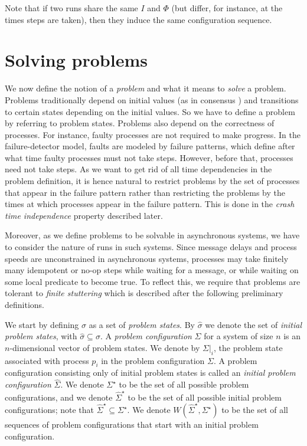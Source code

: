 \documentclass[11pt]{article}
\newcommand{\conf}{\Sigma}
\newcommand{\setConf}{\Sigma^\star}
\newcommand{\initConf}{\hat{\conf}}
\newcommand{\initSetConf}{\hat{\Sigma}^\star}
\newcommand{\seqprobconf}{W(\initSetConf,\setConf)}
\begin{document}
Note that if two runs share the same $I$ and $\Phi$ (but differ, for
     instance, at the times steps are taken), then they induce the
     same configuration sequence.



\section{Solving problems}\label{sec:problemDefinition}

We now define the notion of a \emph{problem} and what it means to
     \emph{solve} a problem.
Problems traditionally depend on initial values (as in consensus
     \cite{FLP}) and transitions to certain states depending on the
     initial values.
So we have to define a problem by referring to problem states.
Problems also depend on the correctness of processes.
For instance, faulty processes are not required to make progress.
In the failure-detector model, faults are modeled by failure patterns,
     which define after what time faulty processes must not take
     steps.
However, before that, processes need not take steps.
As we want to get rid of all time dependencies in the problem
     definition, it is hence natural to restrict problems by the set
     of processes that appear in the failure pattern rather than
     restricting the problems by the times at which  processes appear
     in the failure pattern.
This is done in the \emph{crash time independence} property described
     later.

Moreover, as we define problems to be solvable in asynchronous
     systems, we have to consider the nature of runs in such systems.
Since message delays and process speeds are unconstrained in
     asynchronous systems, processes may take finitely many idempotent
     or no-op steps while waiting for a message, or while waiting on
     some local predicate to become true.
To reflect this, we require that problems are tolerant to \emph{finite
     stuttering} which is described after the following preliminary
     definitions.

We start by defining $\sigma$ as a set of \emph{problem states}.
By $\hat{\sigma}$ we denote the set of \emph{initial problem states},
     with $\hat{\sigma}\subseteq\sigma$.
A \emph{problem configuration} $\conf$ for a system of size $n$ is an
     $n$-dimensional vector of problem states.
We denote by $\conf|_i$, the problem state associated with process
     $p_i$ in the problem configuration $\conf$.
A problem configuration consisting only of initial problem states is
     called an \emph{initial problem configuration} $\initConf$.
We denote $\setConf$ to be the set of all possible problem
     configurations, and we denote $\initSetConf$ to be the set of all
     possible initial problem configurations; note that $\initSetConf
     \subseteq \setConf$.
We denote $\seqprobconf$ to be the set of all sequences of problem
     configurations that start with an initial problem configuration.
\end{document}
